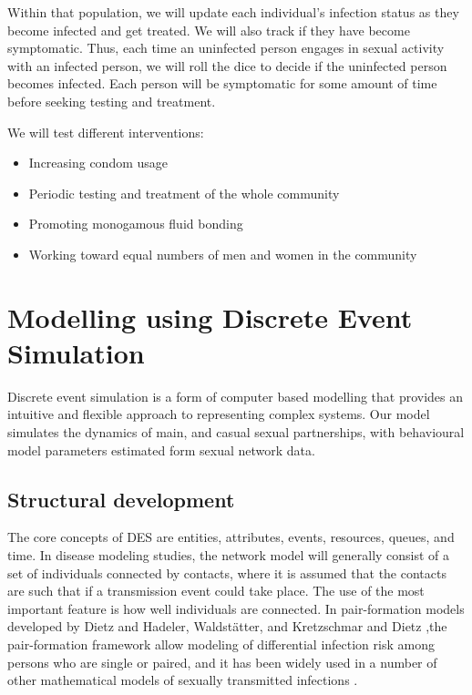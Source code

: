 \documentclass{article}
\begin{document}
\begin{normalsize}
   	Within that population, we will update each individual's infection status as they become infected and get treated. We will also track if they have become symptomatic. Thus, each time an uninfected person engages in sexual activity with an infected person, we will roll the dice to decide if the uninfected person becomes infected. Each person will be symptomatic for some amount of time before seeking testing and treatment.
   	
   	We will test different interventions:
   	\begin{itemize}
    \item Increasing condom usage
    \item Periodic testing and treatment of the whole community 
    \item Promoting monogamous fluid bonding
	\item Working toward equal numbers of men and women in the community
   	\end{itemize}     
    
    \section{Modelling using Discrete Event Simulation}
	Discrete event simulation is a form of computer based modelling that provides an intuitive and flexible approach to representing complex systems. Our model simulates the dynamics of main, and casual sexual partnerships, with behavioural model parameters estimated form sexual network data.
	
	\subsection{Structural development}
	The core concepts of DES are entities, attributes, events, resources, queues, and time. In disease modeling studies, the network model will generally consist of a set of individuals connected by contacts, where it is assumed that the contacts are such that if a transmission event could take place. The use of the most important feature is how well individuals are connected. In pair-formation models developed by Dietz and Hadeler, Waldstätter, and Kretzschmar and Dietz \cite{dietz_hadeler_1988} ,the pair-formation framework allow modeling of differential infection risk among persons who are single or paired, and it has been widely used in a number of other mathematical models of sexually transmitted infections \cite{heijne_althaus_herzog_kretzschmar_low_2011, powers_ghani_miller_hoffman_pettifor_kamanga_martinson_cohen_2011,xiridou_geskus_wit_coutinho_kretzschmar_2003, ferguson_garnett_2000}.
	

\end{normalsize}
\end{document}
